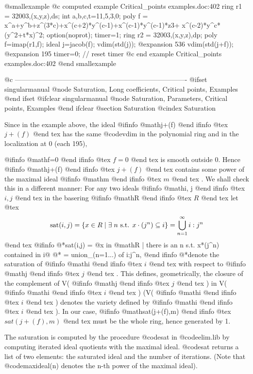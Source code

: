 @smallexample
@c computed example Critical_points examples.doc:402 
  ring r1 = 32003,(x,y,z),ds;
  int a,b,c,t=11,5,3,0;
  poly f = x^a+y^b+z^(3*c)+x^(c+2)*y^(c-1)+x^(c-1)*y^(c-1)*z3+
           x^(c-2)*y^c*(y^2+t*x)^2;
  option(noprot);
  timer=1;
  ring r2 = 32003,(x,y,z),dp;
  poly f=imap(r1,f);
  ideal j=jacob(f);
  vdim(std(j));
@expansion{} 536
  vdim(std(j+f));
@expansion{} 195
  timer=0;  // reset timer
@c end example Critical_points examples.doc:402
@end smallexample

@c ----------------------------------------------------------------------------
@ifset singularmanual
@node Saturation, Long coefficients, Critical points, Examples
@end ifset
@ifclear singularmanual
@node Saturation, Parameters, Critical points, Examples
@end ifclear
@section Saturation
@cindex Saturation

Since in the example above, the ideal 
@ifinfo
@math{j+(f)}
@end ifinfo
@tex
$j+(f)$
@end tex
 has the same @code{vdim}
in the polynomial ring and in the localization at 0 (each 195),

@ifinfo
@math{f=0}
@end ifinfo
@tex
$f=0$
@end tex
 is smooth outside 0.
Hence 
@ifinfo
@math{j+(f)}
@end ifinfo
@tex
$j+(f)$
@end tex
 contains some power of the maximal ideal 
@ifinfo
@math{m}
@end ifinfo
@tex
$m$
@end tex
. We shall
check this in a different manner:
For any two ideals 
@ifinfo
@math{i, j}
@end ifinfo
@tex
$i, j$
@end tex
 in the basering 
@ifinfo
@math{R}
@end ifinfo
@tex
$R$
@end tex
 let
@tex
$$
\hbox{sat}(i,j)=\{x\in R\;|\; \exists\;n\hbox{ s.t. }
x\cdot(j^n)\subseteq i\}
= \bigcup_{n=1}^\infty i:j^n$$
@end tex
@ifinfo
@*sat(i,j) = @{x in @math{R} | there is an n s.t. x*(j^n) contained in i@}
@*         = union_(n=1...) of i:j^n,
@end ifinfo
@*denote the saturation of 
@ifinfo
@math{i}
@end ifinfo
@tex
$i$
@end tex
 with respect to 
@ifinfo
@math{j}
@end ifinfo
@tex
$j$
@end tex
. This defines,
geometrically, the closure of the complement of V(
@ifinfo
@math{j}
@end ifinfo
@tex
$j$
@end tex
) in V(
@ifinfo
@math{i}
@end ifinfo
@tex
$i$
@end tex
)
(V(
@ifinfo
@math{i}
@end ifinfo
@tex
$i$
@end tex
) denotes the variety defined by 
@ifinfo
@math{i}
@end ifinfo
@tex
$i$
@end tex
).
In our case, 
@ifinfo
@math{sat(j+(f),m)}
@end ifinfo
@tex
$sat(j+(f),m)$
@end tex
 must be the whole ring, hence
generated by 1.

The saturation is computed by the procedure @code{sat} in
@code{elim.lib} by computing iterated ideal quotients with the maximal
ideal.  @code{sat} returns a list of two elements: the saturated ideal
and the number of iterations.  (Note that @code{maxideal(n)} denotes the
n-th power of the maximal ideal).

